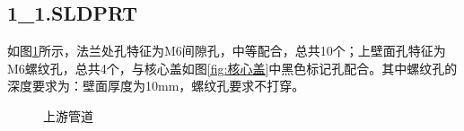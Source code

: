 \documentclass{MyLatex}
\begin{document}
\subsection{1\_1.SLDPRT}
如图\ref{fig:上水管}所示，法兰处孔特征为M6间隙孔，中等配合，总共10个；上壁面孔特征为M6螺纹孔，总共4个，与核心盖如图\ref{fig:核心盖}中黑色标记孔配合。其中螺纹孔的深度要求为：壁面厚度为10mm，螺纹孔要求不打穿。
\begin{figure}[H]
\centering
{}
\quad
{}
\caption{上游管道} \label{fig:上水管}
\end{figure}
\end{document}
